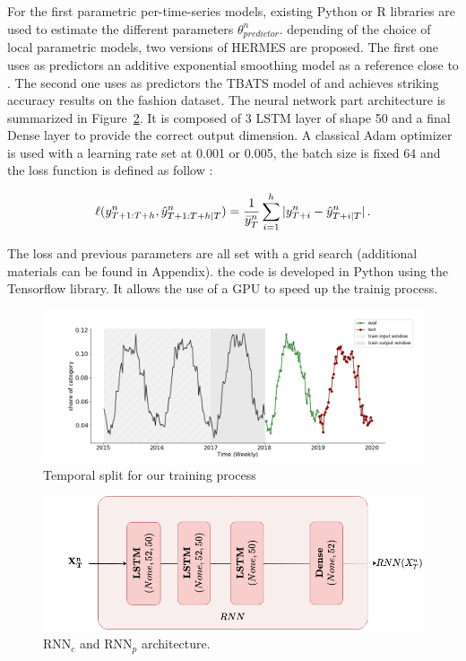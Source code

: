 \documentclass{article} %
\newcommand{\ts}{y}
\newcommand{\tspred}{\hat{\ts}}
\newcommand{\statparam}{\theta_{predictor}}
\newcommand{\lag}{h}
\newcommand{\meants}{\Bar{\ts}}
\newcommand{\predictor}{\mathrm{RNN}_p}
\newcommand{\classifier}{\mathrm{RNN}_c}
\begin{document}
For the first parametric per-time-series models, existing Python or R libraries are used to estimate the different parameters $\statparam^n$. %
depending of the choice of local parametric models, two versions of HERMES are proposed. The first one uses as predictors an additive exponential smoothing model as a reference close to \cite{smyl2020hybrid}. The second one uses as predictors the TBATS model of \cite{doi:10.1198/jasa.2011.tm09771} and  achieves striking accuracy results on the fashion dataset. The neural network part architecture is summarized in Figure~\ref{fig:rnn_architecture}. It is composed of 3 LSTM layer of shape 50 and a final Dense layer to provide the correct output dimension. A classical Adam optimizer is used with a learning rate set at 0.001 or 0.005, the batch size is fixed 64 and the loss function is defined as follow :

$$
\ell(\ts^n_{T+1:T+\lag},\tspred^n_{T+1:T+\lag|T}) = \frac{1}{\meants^n_T}\sum_{i=1}^{\lag}|\ts^n_{T+i} - \tspred^n_{T+i|T}|\,.
$$
%


The loss and previous parameters are all set with a grid search (additional materials can be found in Appendix). the code is developed in Python using the Tensorflow library. It allows the use of a GPU to speed up the trainig process.



\begin{figure}
  \centering
    \includegraphics[width=1.\linewidth]{figure/train_eval_test_set}
  \caption{Temporal split for our training process}
\label{fig:train_eval_test_set}
\end{figure}

\begin{figure}
  \centering
    \includegraphics[width=0.8\linewidth]{figure/lstm_archi}
  \caption{$\classifier$ and $\predictor$ architecture.}
\label{fig:rnn_architecture}
\end{figure}
\end{document}
